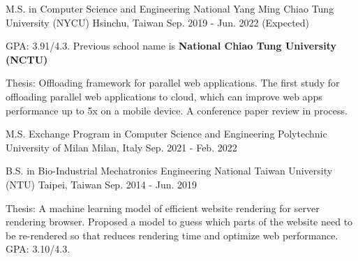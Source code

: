 

\begin{cventries}

  
\cventry
  {M.S. in Computer Science and Engineering} %
  {National Yang Ming Chiao Tung University (NYCU)} %
  {Hsinchu, Taiwan} %
  {Sep. 2019 - Jun. 2022 (Expected)} %
  {
    \begin{cvitems} %
      \item {GPA: 3.91/4.3. Previous school name is \textbf{National Chiao Tung University (NCTU)}}
      \item {Thesis: Offloading framework for parallel web applications.
        The first study for offloading parallel web applications to cloud,
        which can improve web apps performance up to 5x on a mobile device.
        A conference paper review in process.
      }
    \end{cvitems}
  }

  \vspace{-3mm}

\cventry
    {M.S. Exchange Program in Computer Science and Engineering} %
    {Polytechnic University of Milan} %
    {Milan, Italy} %
    {Sep. 2021 - Feb. 2022} %
    {}

  \vspace{-6mm}

  \cventry
    {B.S. in Bio-Industrial Mechatronics Engineering} %
    {National Taiwan University (NTU)} %
    {Taipei, Taiwan} %
    {Sep. 2014 - Jun. 2019} %
    {
      \begin{cvitems} %
        \item {Thesis: A machine learning model of efficient website rendering for server rendering browser.
          Proposed a model to guess which parts of the website need to be re-rendered so that reduces rendering time
          and optimize web performance. GPA: 3.10/4.3. 
        }
      \end{cvitems}
    }

\end{cventries}
